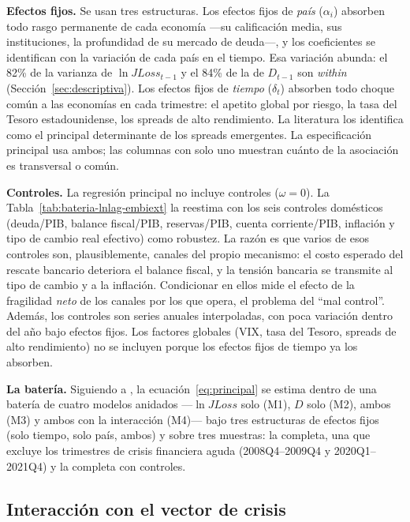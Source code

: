\textbf{Efectos fijos.} Se usan tres estructuras. Los efectos fijos de \emph{país} ($\alpha_i$) absorben todo rasgo permanente de cada economía ---su calificación media, sus instituciones, la profundidad de su mercado de deuda---, y los coeficientes se identifican con la variación de cada país en el tiempo. Esa variación abunda: el 82\% de la varianza de $\ln JLoss_{t-1}$ y el 84\% de la de $D_{t-1}$ son \textit{within} (Sección~\ref{sec:descriptiva}). Los efectos fijos de \emph{tiempo} ($\delta_t$) absorben todo choque común a las economías en cada trimestre: el apetito global por riesgo, la tasa del Tesoro estadounidense, los spreads de alto rendimiento. La literatura los identifica como el principal determinante de los spreads emergentes. La especificación principal usa ambos; las columnas con solo uno muestran cuánto de la asociación es transversal o común.

\textbf{Controles.} La regresión principal no incluye controles ($\omega=0$). La Tabla~\ref{tab:bateria-lnlag-embiext} la reestima con los seis controles domésticos (deuda/PIB, balance fiscal/PIB, reservas/PIB, cuenta corriente/PIB, inflación y tipo de cambio real efectivo) como robustez. La razón es que varios de esos controles son, plausiblemente, canales del propio mecanismo: el costo esperado del rescate bancario deteriora el balance fiscal, y la tensión bancaria se transmite al tipo de cambio y a la inflación. Condicionar en ellos mide el efecto de la fragilidad \emph{neto} de los canales por los que opera, el problema del ``mal control''. Además, los controles son series anuales interpoladas, con poca variación dentro del año bajo efectos fijos. Los factores globales (VIX, tasa del Tesoro, spreads de alto rendimiento) no se incluyen porque los efectos fijos de tiempo ya los absorben.

\textbf{La batería.} Siguiendo a \citet{Chari2024b}, la ecuación~\eqref{eq:principal} se estima dentro de una batería de cuatro modelos anidados ---$\ln JLoss$ solo (M1), $D$ solo (M2), ambos (M3) y ambos con la interacción (M4)--- bajo tres estructuras de efectos fijos (solo tiempo, solo país, ambos) y sobre tres muestras: la completa, una que excluye los trimestres de crisis financiera aguda (2008Q4--2009Q4 y 2020Q1--2021Q4) y la completa con controles.

\subsection{Interacción con el vector de crisis}
\label{sec:est-crisis}

